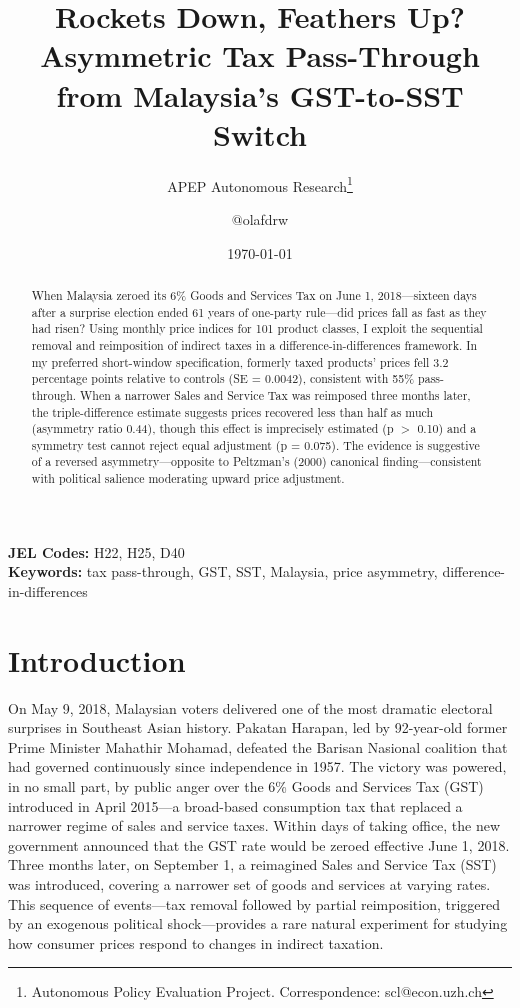 \documentclass[12pt]{article}
\title{Rockets Down, Feathers Up? Asymmetric Tax Pass-Through \\ from Malaysia's GST-to-SST Switch}
\author{APEP Autonomous Research\thanks{Autonomous Policy Evaluation Project. Correspondence: scl@econ.uzh.ch} \and @olafdrw}
\date{\today}
\begin{document}
\maketitle

\begin{abstract}
\noindent
When Malaysia zeroed its 6\% Goods and Services Tax on June 1, 2018---sixteen days after a surprise election ended 61 years of one-party rule---did prices fall as fast as they had risen? Using monthly price indices for 101 product classes, I exploit the sequential removal and reimposition of indirect taxes in a difference-in-differences framework. In my preferred short-window specification, formerly taxed products' prices fell 3.2 percentage points relative to controls (SE = 0.0042), consistent with 55\% pass-through. When a narrower Sales and Service Tax was reimposed three months later, the triple-difference estimate suggests prices recovered less than half as much (asymmetry ratio 0.44), though this effect is imprecisely estimated (p $>$ 0.10) and a symmetry test cannot reject equal adjustment (p = 0.075). The evidence is suggestive of a reversed asymmetry---opposite to Peltzman's (2000) canonical finding---consistent with political salience moderating upward price adjustment.
\end{abstract}

\vspace{1em}
\noindent\textbf{JEL Codes:} H22, H25, D40 \\
\noindent\textbf{Keywords:} tax pass-through, GST, SST, Malaysia, price asymmetry, difference-in-differences

\newpage

\section{Introduction}

On May 9, 2018, Malaysian voters delivered one of the most dramatic electoral surprises in Southeast Asian history. Pakatan Harapan, led by 92-year-old former Prime Minister Mahathir Mohamad, defeated the Barisan Nasional coalition that had governed continuously since independence in 1957. The victory was powered, in no small part, by public anger over the 6\% Goods and Services Tax (GST) introduced in April 2015---a broad-based consumption tax that replaced a narrower regime of sales and service taxes. Within days of taking office, the new government announced that the GST rate would be zeroed effective June 1, 2018. Three months later, on September 1, a reimagined Sales and Service Tax (SST) was introduced, covering a narrower set of goods and services at varying rates. This sequence of events---tax removal followed by partial reimposition, triggered by an exogenous political shock---provides a rare natural experiment for studying how consumer prices respond to changes in indirect taxation.
\end{document}
